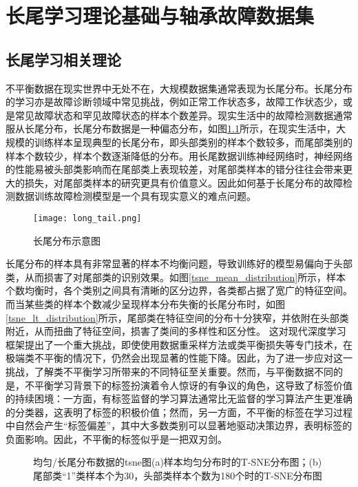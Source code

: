 \documentclass[master]{thesis-uestc}
\begin{document}
\chapter{长尾学习理论基础与轴承故障数据集}
\section{长尾学习相关理论}
不平衡数据在现实世界中无处不在，大规模数据集通常表现为长尾分布。长尾分布的学习亦是故障诊断领域中常见挑战，例如正常工作状态多，故障工作状态少，或是常见故障状态和罕见故障状态的样本个数差异。现实生活中的故障检测数据通常服从长尾分布，长尾分布数据是一种偏态分布，如图\ref{fig_long_tail}所示，在现实生活中，大规模的训练样本呈现典型的长尾分布，即头部类别的样本个数较多，而尾部类别的样本个数较少，样本个数逐渐降低的分布。用长尾数据训练神经网络时，神经网络的性能易被头部类影响而在尾部类上表现较差，对尾部类样本的错分往往会带来更大的损失，对尾部类样本的研究更具有价值意义。因此如何基于长尾分布的故障检测数据训练故障检测模型是一个具有现实意义的难点问题。
\begin{figure}[h]
    \texttt{[image: long\_tail.png]}
    \caption{长尾分布示意图}
    \label{fig_long_tail}
\end{figure}

长尾分布的样本具有非常显著的样本不均衡问题，导致训练好的模型易偏向于头部类，从而损害了对尾部类的识别效果。如图\ref{tsne_mean_distribution}所示，样本个数均衡时，各个类别之间具有清晰的区分边界，各类都占据了宽广的特征空间。而当某些类的样本个数减少呈现样本分布失衡的长尾分布时，如图\ref{tsne_lt_distribution}所示，尾部类在特征空间的分布十分狭窄，并依附在头部类附近，从而扭曲了特征空间，损害了类间的多样性和区分性。
这对现代深度学习框架提出了一个重大挑战，即使使用数据重采样方法或类平衡损失等专门技术，在极端类不平衡的情况下，仍然会出现显著的性能下降。因此，为了进一步应对这一挑战，了解类不平衡学习所带来的不同特征至关重要。然而，与平衡数据不同的是，不平衡学习背景下的标签扮演着令人惊讶的有争议的角色，这导致了标签价值的持续困境：一方面，有标签监督的学习算法通常比无监督的学习算法产生更准确的分类器，这表明了标签的积极价值；然而，另一方面，不平衡的标签在学习过程中自然会产生“标签偏差”，其中大多数类别可以显著地驱动决策边界，表明标签的负面影响。因此，不平衡的标签似乎是一把双刃剑。
\begin{figure}[h]
    \caption{均匀/长尾分布数据的tsne图(a)样本均匀分布时的T-SNE分布图；(b)尾部类“1”类样本个为30，头部类样本个数为180个时的T-SNE分布图}
    \label{fig2}
\end{figure}
\end{document}
